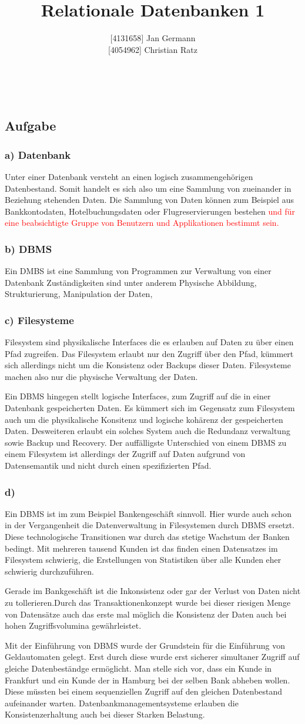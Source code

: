 \documentclass[12pt,a4paper,DIV=9]{scrartcl}
\author{{[}4131658{]} Jan Germann \\{[}4054962{]} Christian Ratz}
\title{Relationale Datenbanken 1}
\newcounter{temp}
\newcommand{\aufgabe}[1]{
  \setcounter{temp}{\value{subsection}}
  \setcounter{subsection}{#1}
  \addtocounter{subsection}{-1}
  \subsection{Aufgabe}
  \setcounter{subsection}{\value{temp}}
}
\newcommand{\teil}[2][]{
  \subsubsection*{#2) #1}
}
\renewcommand{\author}[1]{\renewcommand{\author}{#1}}
\renewcommand{\title}[1]{\renewcommand{\title}{#1}}
\newcommand{\makehomeworktitle}{
  \begin{minipage}{6.5cm}
    \sf{\author}
  \end{minipage}
  \begin{minipage}{6.5cm}
    \begin{flushright}
      \sf{\title\\\today}
    \end{flushright}
  \end{minipage}
  \\[0.2cm]
  \begin{center}
    \sf{
      \color{blue}{
        \LARGE{Aufgabenblatt \blattnr}
      }
    }
  \end{center}
  \vspace{0.1cm}
}
\begin{document}
\makehomeworktitle

\aufgabe{2}
\teil[Datenbank]{a}
Unter einer Datenbank versteht an einen logisch zusammengehörigen Datenbestand. Somit handelt es sich also um eine Sammlung von zueinander in Beziehung stehenden Daten. Die Sammlung von Daten können zum Beispiel aus Bankkontodaten, Hotelbuchungsdaten oder Flugreservierungen bestehen \textcolor{red}{und f\"ur eine beabsichtigte Gruppe von Benutzern und Applikationen bestimmt sein.}

\teil[DBMS]{b}
  Ein DMBS ist eine Sammlung von Programmen zur Verwaltung von einer Datenbank
Zuständigkeiten sind unter anderem Physische Abbildung, Strukturierung, Manipulation der Daten,

\teil[Filesysteme]{c}
  Filesystem sind physikalische Interfaces die es erlauben auf Daten zu über einen Pfad zugreifen. Das Filesystem erlaubt nur den Zugriff über den Pfad, kümmert sich allerdings nicht um die Konsistenz oder Backups dieser Daten. Filesysteme machen also nur die physische Verwaltung der Daten.

  Ein DBMS hingegen stellt logische Interfaces, zum Zugriff auf die in einer Datenbank gespeicherten Daten. Es kümmert sich im Gegensatz zum Filesystem auch um die physikalische Konsitenz und logische kohärenz der gespeicherten Daten. Desweiteren erlaubt ein solches System auch die Redundanz verwaltung sowie Backup und Recovery. Der auffälligste Unterschied von einem DBMS zu einem Filesystem ist allerdings der Zugriff auf Daten aufgrund von Datensemantik und nicht durch einen spezifizierten Pfad.

\teil{d}
  Ein DBMS ist im zum Beispiel Bankengeschäft sinnvoll. Hier wurde auch schon in der Vergangenheit die Datenverwaltung in Filesystemen durch DBMS ersetzt. Diese technologische Transitionen war durch das stetige Wachstum der Banken bedingt. Mit mehreren tausend Kunden ist das finden einen Datensatzes im Filesystem schwierig, die Erstellungen von Statistiken über alle Kunden eher schwierig durchzuführen.

  Gerade im Bankgeschäft ist die Inkonsistenz oder gar der Verlust von Daten nicht zu tollerieren.Durch das Transaktionenkonzept wurde bei dieser riesigen Menge von Datensätze auch das erste mal möglich die Konsistenz der Daten auch bei hohen Zugriffsvolumina gewährleistet.

  Mit der Einführung von DBMS wurde der Grundstein für die Einführung von Geldautomaten gelegt. Erst durch diese wurde erst sicherer simultaner Zugriff auf gleiche Datenbeständge ermöglicht. Man stelle sich vor, dass ein Kunde in Frankfurt und ein Kunde der in Hamburg bei der selben Bank abheben wollen. Diese müssten bei einem sequenziellen Zugriff auf den gleichen Datenbestand aufeinander warten. Datenbankmanagementsysteme erlauben die Konsistenzerhaltung auch bei dieser Starken Belastung.
\end{document}
